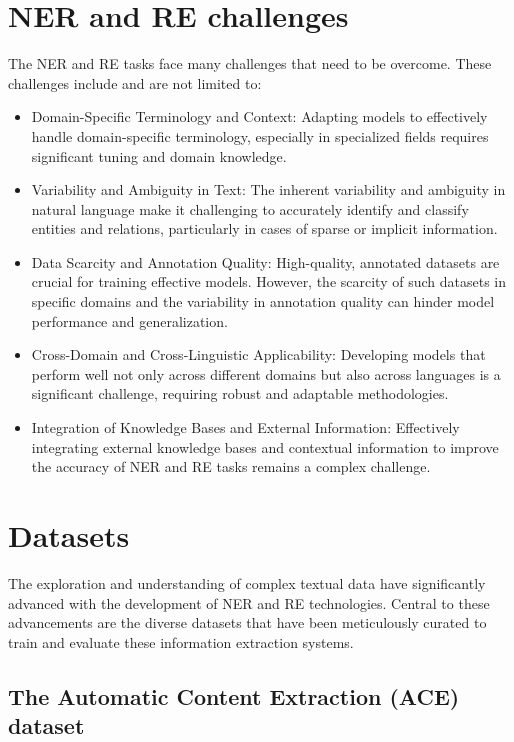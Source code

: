 \section{NER and RE challenges}
The NER and RE tasks face many challenges that need to be overcome. These challenges include and are not limited to:
\begin{itemize}
\item Domain-Specific Terminology and Context\cite{fang-etal-2021-tebner}: Adapting models to effectively handle domain-specific terminology, especially in specialized fields requires significant tuning and domain knowledge.

\item Variability and Ambiguity in Text\cite{8520330}: The inherent variability and ambiguity in natural language make it challenging to accurately identify and classify entities and relations, particularly in cases of sparse or implicit information.

\item Data Scarcity and Annotation Quality: High-quality, annotated datasets are crucial for training effective models. However, the scarcity of such datasets in specific domains and the variability in annotation quality can hinder model performance and generalization.

\item Cross-Domain and Cross-Linguistic Applicability: Developing models that perform well not only across different domains but also across languages is a significant challenge\cite{tsai-etal-2016-cross}, requiring robust and adaptable methodologies.

\item Integration of Knowledge Bases and External Information: Effectively integrating external knowledge bases and contextual information to improve the accuracy of NER and RE tasks remains a complex challenge\cite{le2018improving}.
\end{itemize}

\section{Datasets}
The exploration and understanding of complex textual data have significantly advanced with the development of NER and RE technologies. Central to these advancements are the diverse datasets that have been meticulously curated to train and evaluate these information extraction systems.

\subsection{The Automatic Content Extraction (ACE) dataset}

